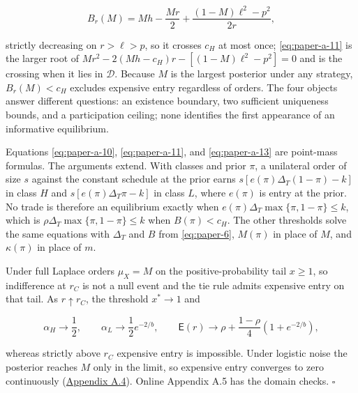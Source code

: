 \[
B_r(M)=Mh-\frac{Mr}{2}+\frac{(1-M)\ell^2-p^2}{2r},
\tag{A.13}\label{eq:paper-a-13}
\]

strictly decreasing on \(r>\ell>p\), so it crosses \(c_H\) at most once;
\eqref{eq:paper-a-11} is the larger root of
\(Mr^2-2(Mh-c_H)r-[(1-M)\ell^2-p^2]=0\) and is the crossing when it lies
in \(\mathcal D\). Because \(M\) is the largest posterior under any
strategy, \(B_r(M)<c_H\) excludes expensive entry regardless of orders.
The four objects answer different questions: an existence boundary, two
sufficient uniqueness bounds, and a participation ceiling; none
identifies the first appearance of an informative equilibrium.

Equations \eqref{eq:paper-a-10}, \eqref{eq:paper-a-11}, and
\eqref{eq:paper-a-13} are point-mass formulas. The arguments extend.
With classes and prior \(\pi\), a unilateral order of size \(s\)
against the constant schedule at the prior earns
\(s[e(\pi)\Delta_T(1-\pi)-k]\) in class \(H\) and
\(s[e(\pi)\Delta_T\pi-k]\) in class \(L\), where \(e(\pi)\) is entry at
the prior. No trade is therefore an equilibrium exactly when
\(e(\pi)\Delta_T\max\{\pi,1-\pi\}\le k\), which is
\(\rho\Delta_T\max\{\pi,1-\pi\}\le k\) when \(B(\pi)<c_H\). The other
thresholds solve the same equations with \(\Delta_T\) and \(B\) from
\eqref{eq:paper-6}, \(M(\pi)\) in place of \(M\), and \(\kappa(\pi)\) in
place of \(m\).

Under full Laplace orders \(\mu_X=M\) on the positive-probability tail
\(x\ge1\), so indifference at \(r_C\) is not a null event and the tie
rule admits expensive entry on that tail. As \(r\uparrow r_C\), the
threshold \(x^*\to1\) and

\[
\alpha_H\to\frac12,\qquad\alpha_L\to\frac12e^{-2/b},\qquad
\mathsf E(r)\to\rho+\frac{1-\rho}{4}\left(1+e^{-2/b}\right),
\tag{A.14}\label{eq:paper-a-14}
\]

whereas strictly above \(r_C\) expensive entry is impossible. Under
logistic noise the posterior reaches \(M\) only in the limit, so
expensive entry converges to zero continuously
(\hyperref[pa-calculations]{Appendix A.4}). Online Appendix A.5 has the
domain checks. \(\square\)
